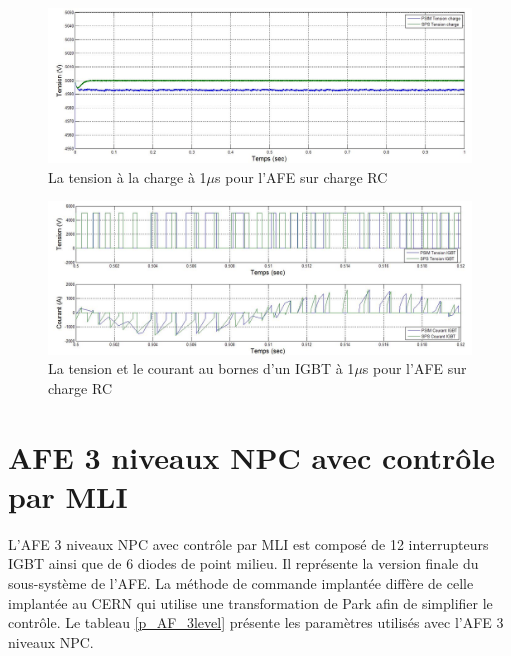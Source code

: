 \documentclass[11pt,letterpaper,final]{report}
\begin{document}
\begin{figure}[htb]
\centering
\includegraphics[scale=0.5]{Fig/AFERC/vch.jpg}
\caption{La tension à la charge à 1$\mu$s pour l'AFE sur charge RC}
\label{AF_RC_ten}
\end{figure}



\begin{figure}[htb]
\centering
\includegraphics[scale=0.5]{Fig/AFERC/IGBT.jpg}
\caption{La tension et le courant au bornes d'un IGBT à 1$\mu$s pour l'AFE sur charge RC}
\label{AF_RC_igbt}
\end{figure}

\clearpage
\section{AFE 3 niveaux NPC avec contrôle par MLI}
L'AFE 3 niveaux NPC avec contrôle par MLI est composé de 12 interrupteurs IGBT ainsi que de 6 diodes de point milieu. Il représente la version finale du sous-système de l'AFE. La méthode de commande implantée diffère de celle implantée au CERN qui utilise une transformation de Park afin de simplifier le contrôle. Le tableau \ref{p_AF_3level} présente les paramètres utilisés avec l'AFE 3 niveaux NPC.
\end{document}
